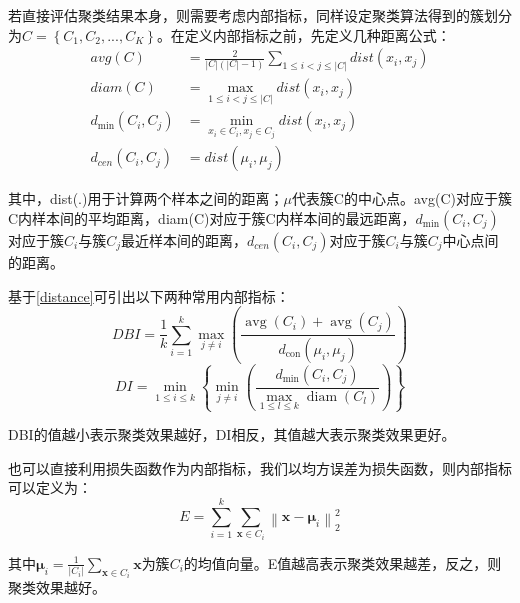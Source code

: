 若直接评估聚类结果本身，则需要考虑内部指标，同样设定聚类算法得到的簇划分为$C=\left\{C_1,C_2,...,C_K\right\}$。在定义内部指标之前，先定义几种距离公式：
\begin{equation}
\label{distance}
\begin{aligned}
avg(C) &=\frac{2}{|C|(|C|-1)} \sum_{1 \leqslant i<j \leqslant|C|} dist\left(x_{i}, x_{j}\right) \\
diam(C) &=\max _{1 \leqslant i<j \leqslant|C|} dist\left(x_{i}, x_{j}\right) \\
d_{\min }\left(C_{i}, C_{j}\right) &=\min _{x_{i} \in C_{i}, x_{j} \in C_{j}} dist\left(x_{i}, x_{j}\right) \\
d_{cen}\left(C_{i}, C_{j}\right) &=dist\left(\mu_{i}, \mu_{j}\right)
\end{aligned}
\end{equation}

其中，dist(.)用于计算两个样本之间的距离；$\mu$代表簇C的中心点。avg(C)对应于簇C内样本间的平均距离，diam(C)对应于簇C内样本间的最远距离，$d_{\min }\left(C_{i}, C_{j}\right)$对应于簇$C_i$与簇$C_j$最近样本间的距离，$d_{cen}\left(C_{i}, C_{j}\right)$对应于簇$C_i$与簇$C_j$中心点间的距离。

基于\ref{distance}可引出以下两种常用内部指标：
\begin{equation}
\label{DBI}
DBI=\frac{1}{k} \sum_{i=1}^{k} \max _{j \neq i}\left(\frac{\operatorname{avg}\left(C_{i}\right)+\operatorname{avg}\left(C_{j}\right)}{d_{\operatorname{con}}\left(\mu_{i}, \mu_{j}\right)}\right)
\end{equation}
\begin{equation}
\label{DI}
DI=\min _{1 \leqslant i \leqslant k}\left\{\min _{j \neq i}\left(\frac{d_{\min }\left(C_{i}, C_{j}\right)}{\max _{1 \leqslant l \leqslant k} \operatorname{diam}\left(C_{l}\right)}\right)\right\}
\end{equation}

DBI的值越小表示聚类效果越好，DI相反，其值越大表示聚类效果更好。

也可以直接利用损失函数作为内部指标，我们以均方误差为损失函数，则内部指标可以定义为：
\begin{equation}
\label{kmeanscost}
E=\sum_{i=1}^{k} \sum_{\boldsymbol{x} \in C_{i}}\left\|\boldsymbol{x}-\boldsymbol{\mu}_{i}\right\|_{2}^{2}
\end{equation}

其中$\boldsymbol{\mu}_{i}=\frac{1}{\left|C_{i}\right|} \sum_{\boldsymbol{x} \in C_{i}} \boldsymbol{x}$为簇$C_i$的均值向量。E值越高表示聚类效果越差，反之，则聚类效果越好。

